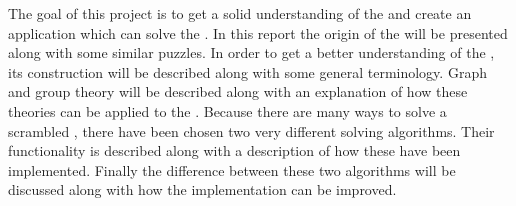 The goal of this project is to get a solid understanding of the \rubik{} and create an application which can solve the \rubik{}.
In this report the origin of the \rubik{} will be presented along with some similar puzzles. 
In order to get a better understanding of the \rubik{}, its construction will be described along with some general terminology. 
Graph and group theory will be described along with an explanation of how these theories can be applied to the \rubik{}.
Because there are many ways to solve a scrambled \rubik{}, there have been chosen two very different solving algorithms.
Their functionality is described along with a description of how these have been implemented.
Finally the difference between these two algorithms will be discussed along with how the implementation can be improved.